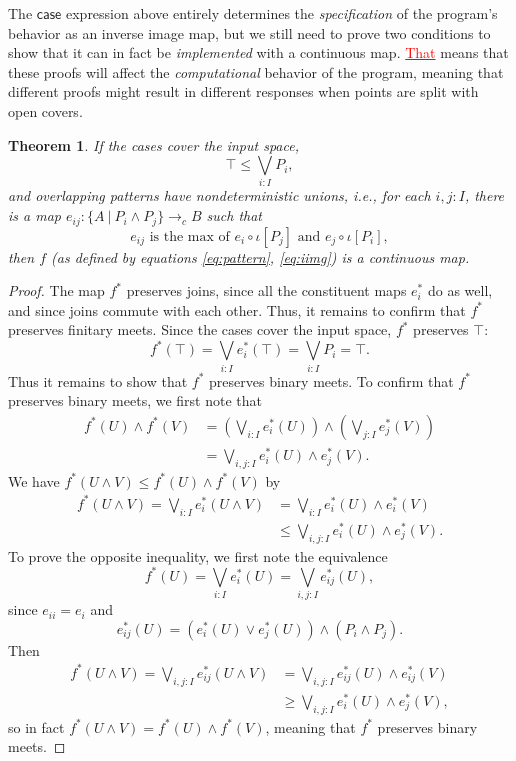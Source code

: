 \documentclass[conference]{IEEEtran}
\newtheorem{theorem}{Theorem}
\newcommand{\cto}{\to_c}
\newcommand{\suchthat}{\ |\ }
\newcommand{\oinclf}[1]{\iota[{#1}]}
\newcommand{\isthemaxof}[3]{{#1}\text{ is the max of }{#2}\text{ and }{#3}}
\newcommand{\iimg}[1]{#1^*}
\newcommand{\grammar}[1]{\textcolor{red}{\underline{#1}}}
\begin{document}
The $\mathsf{case}$ expression above entirely determines the \emph{specification} of the program's behavior as an inverse image map, but we still need to prove two conditions to show that it can in fact be \emph{implemented} with a continuous map. \grammar{That} means that these proofs will affect the \emph{computational} behavior of the program, meaning that different proofs might result in different responses when points are split with open covers. 
\begin{theorem}
\label{pattern}
If the cases cover the input space,
\[
\top \le \bigvee_{i : I} P_i \tag{covering},
\]
and overlapping patterns have nondeterministic unions, i.e., for each $i, j : I$, there is a map $e_{ij} : \{A \suchthat P_i \wedge P_j \} \cto B$ such that
\[
\isthemaxof{ e_{ij} }{ e_i \circ \oinclf{P_j} }{ e_j \circ \oinclf{P_i} }, \tag{gluing}
\]
then $f$ (as defined by equations \ref{eq:pattern}, \ref{eq:iimg})
is a continuous map.
\end{theorem}
\begin{proof}
The map $\iimg{f}$ preserves joins, since all the constituent maps $\iimg{e_i}$ do as well, and since joins commute with each other. Thus, it remains to confirm that $\iimg{f}$ preserves finitary meets.
Since the cases cover the input space, $\iimg{f}$ preserves $\top$:
\[
\iimg{f}(\top) = \bigvee_{i : I} \iimg{e_i}(\top) = \bigvee_{i : I}P_i = \top.
\]
Thus it remains to show that $\iimg{f}$ preserves binary meets.
To confirm that $\iimg{f}$ preserves binary meets, we first note that
\begin{align*}
\iimg{f}(U) \wedge \iimg{f}(V) 
  &= \left(\bigvee_{i : I} \iimg{e_i}(U) \right) \wedge \left( \bigvee_{j: I} \iimg{e_j}(V) \right)
\\ &= \bigvee_{i, j : I} \iimg{e_i}(U) \wedge \iimg{e_j}(V).
\end{align*}
We have $\iimg{f}(U \wedge V) \le \iimg{f}(U) \wedge \iimg{f}(V)$ by
\begin{align*}
\iimg{f}(U \wedge V)
  = \bigvee_{i : I} \iimg{e_i}(U \wedge V)
  &= \bigvee_{i : I} \iimg{e_i}(U) \wedge \iimg{e_i}(V)
  \\ &\le \bigvee_{i, j : I} \iimg{e_i}(U) \wedge \iimg{e_j}(V).
\end{align*}
To prove the opposite inequality, we first note the equivalence
\[
\iimg{f}(U) = \bigvee_{i : I} \iimg{e_i}(U) = \bigvee_{i, j : I} \iimg{e_{ij}}(U),
\]
since $e_{ii} = e_i$ and 
\[
\iimg{e_{ij}}(U) = \left( \iimg{e_i}(U) \vee \iimg{e_j}(U) \right) \wedge \left(P_i \wedge P_j \right).
\]
Then
\begin{align*}
\iimg{f}(U \wedge V)
  = \bigvee_{i, j : I} \iimg{e_{ij}}(U \wedge V)
  &= \bigvee_{i, j : I} \iimg{e_{ij}}(U) \wedge \iimg{e_{ij}}(V)
  \\ &\ge \bigvee_{i, j : I} \iimg{e_i}(U) \wedge \iimg{e_j}(V),
\end{align*}
so in fact $\iimg{f}(U \wedge V) = \iimg{f}(U) \wedge \iimg{f}(V)$, meaning that $\iimg{f}$ preserves binary meets.
\end{proof}
\end{document}
